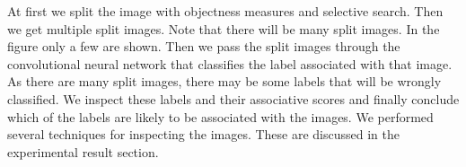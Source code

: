 At first we split the image with objectness measures and selective search. Then we get multiple split images. Note that there will be many split images. In the figure only a few are shown. Then we pass the split images through the convolutional neural network that classifies the label associated with that image. As there are many split images, there may be some labels that will be wrongly classified. We inspect these labels and their associative scores and finally conclude which of the labels are likely to be associated with the images. We performed several techniques for inspecting the images. These are discussed in the experimental result section.
